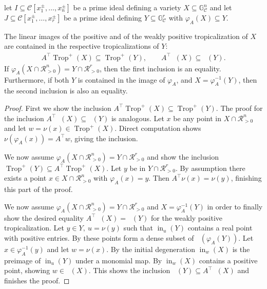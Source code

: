 \documentclass[10pt,a4paper]{amsart}
\DeclareMathOperator{\Tropw}{Trop_\mathcal{C}^+}
\DeclareMathOperator{\Trop}{Trop}
\DeclareMathOperator{\initial}{in}
\newcommand{\CC}{\mathcal{C}}
\newcommand{\RR}{\mathcal{R}}
\newcommand{\inw}{\operatorname{in}_w}
\begin{document}
\begin{proposition}
\label{prop: functoriality of monomial maps}
let $I \subseteq \CC[x_1^\pm, \dots, x_n^\pm]$ be a prime ideal defining a variety $X \subseteq \mathbb{G}^n_\CC$ and let
$J \subseteq \CC[x_1^\pm, \dots, x_r^\pm]$ be a prime ideal defining $Y \subseteq \mathbb{G}^r_\CC$
with $\varphi_A(X) \subseteq Y$.

    The linear images of the positive and of the weakly positive tropicalization of $X$ are contained in the respective tropicalizations of $Y$:
    \begin{align*}
            A^\top \Trop^+(X) \subseteq \Trop^+(Y), \qquad A^\top\Tropw(X) \subseteq \Tropw(Y).
    \end{align*}
    If $\varphi_A(X \cap \RR^n_{> 0 }) = Y\cap\RR^r_{> 0}$,
    then the first inclusion is an equality.
    Furthermore, if both $Y$ is contained in the image of $\varphi_A$,
    and $X = \varphi_A^{-1}(Y)$,
    then the second inclusion is also an equality.
\end{proposition}

\begin{proof}
    First we show the inclusion $A^\top \Trop^+(X) \subseteq \Trop^+(Y)$. The proof for the inclusion $A^\top \Tropw(X) \subseteq \Tropw(Y)$ is analogous.
    Let $x$ be any point in $X \cap \mathcal{R}^n_{>0}$ and let $w = \nu(x) \in \Trop^+(X)$. 
    Direct computation shows $\nu(\varphi_A(x)) = A^\top w$, giving the inclusion.

    We now assume $\varphi_A(X \cap \RR^n_{> 0 }) = Y\cap\RR^r_{> 0}$ and show the inclusion  $\Trop^+(Y) \subseteq A^\top\Trop^+(X)$.
    Let $y$ be in $Y \cap \RR^r_{> 0}$. By assumption there exists a point $x \in X \cap \RR^n_{>0}$ with $\varphi_A(x) = y$. Then $A^\top \nu(x) = \nu(y)$, finishing this part of the proof.

    We now assume $\varphi_A(X \cap \RR^n_{> 0 }) = Y\cap\RR^r_{> 0}$ 
    and $X = \varphi_A^{-1}(Y)$
    in order to finally show the desired equality $A^\top\Tropw(X) = \Tropw(Y)$ for the weakly positive tropicalization.
    Let $y \in Y, \ u  = \nu(y)$ such that
    $\initial_{u} (Y) $ contains a real point with positive entries.
    By  these points form a dense subset of $\Tropw(\varphi_A(Y))$.
     Let $x \in \varphi_A^{-1}(y)$ and let $w = \nu(x)$.
    By  the initial degeneration $\inw(X)$ is the preimage of $\initial_{u} (Y)$ under a monomial map. By  $\inw(X)$ contains a positive point, showing $w \in \Tropw(X)$.
    This shows the inclusion $\Tropw(Y) \subseteq A^\top\Tropw(X)$ and finishes the proof.
\end{proof}
\end{document}

